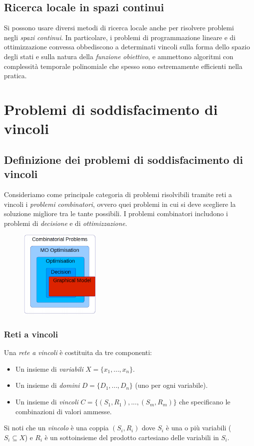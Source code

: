 \documentclass[11pt,oneside]{book}
\begin{document}
\section{Ricerca locale in spazi continui}
Si possono usare diversi metodi di ricerca locale anche per risolvere problemi negli \textit{spazi continui}. In particolare, i problemi di programmazione lineare e di ottimizzazione convessa obbediscono a determinati vincoli sulla forma dello spazio degli stati e sulla natura della \textit{funzione obiettivo}, e ammettono algoritmi con complessità temporale polinomiale che spesso sono estremamente efficienti nella pratica.


\chapter{Problemi di soddisfacimento di vincoli}

\section{Definizione dei problemi di soddisfacimento di vincoli}
Consideriamo come principale categoria di problemi risolvibili tramite reti a vincoli i \textit{problemi combinatori}, ovvero quei problemi in cui si deve scegliere la soluzione migliore tra le tante possibili. I problemi combinatori includono i problemi di \textit{decisione} e di \textit{ottimizzazione}.
\begin{figure}[htp]
	\centering
	\includegraphics[width=0.35\textwidth]{csp.png}
\end{figure}

\subsection{Reti a vincoli}
Una \textit{rete a vincoli} è costituita da tre componenti:
\begin{itemize}
	\item Un insieme di \textit{variabili} $X = \{ x_1, ..., x_n \}$.
	\item Un insieme di \textit{domini} $D = \{ D_1, ..., D_n \}$ (uno per ogni variabile).
	\item Un insieme di \textit{vincoli} $C = \{ (S_1, R_1), ..., (S_m, R_m) \}$ che specificano le combinazioni di valori ammesse.
\end{itemize}
Si noti che un \textit{vincolo} è una coppia $(S_i, R_i)$ dove $S_i$ è una o più variabili ($S_i \subseteq X$) e $R_i$ è un sottoinsieme del prodotto cartesiano delle variabili in $S_i$.
\end{document}
